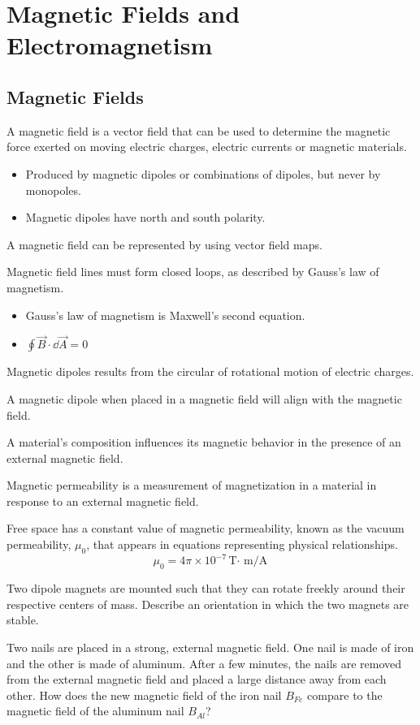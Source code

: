 \documentclass[../em.tex]{subfiles}
\begin{document}
\chapter{Magnetic Fields and Electromagnetism}
\section{Magnetic Fields}
A magnetic field is a vector field that can be used to determine the magnetic force exerted 
on moving electric charges, electric currents or magnetic materials.
\begin{itemize}
    \item Produced by magnetic dipoles or combinations of dipoles, but never by monopoles.
    \item Magnetic dipoles have north and south polarity.
\end{itemize}

A magnetic field can be represented by using vector field maps.

Magnetic field lines must form closed loops, as described by Gauss's law of magnetism.
\begin{itemize}
    \item Gauss's law of magnetism is Maxwell's second equation.
    \item $\oint \vec{B} \cdot \dd\vec{A} = 0$
\end{itemize}

Magnetic dipoles results from the circular of rotational motion of electric charges.

A magnetic dipole when placed in a magnetic field will align with the magnetic field.

A material's composition influences its magnetic behavior in the presence of an external magnetic field.

Magnetic permeability is a measurement of magnetization in a material in response to an external magnetic field.

Free space has a constant value of magnetic permeability, known as the vacuum permeability, $\mu_0$, that appears in equations representing physical relationships.
\[ \mu_0 = 4\pi \times 10^{-7} \text{T$\cdot$ m/A} \]

\ex Two dipole magnets are mounted such that they can rotate freekly around their respective centers of mass. Describe an orientation in which the two magnets are stable.

\ex Two nails are placed in a strong, external magnetic field. One nail is made of iron and the other is made of aluminum. After a few minutes, the nails are removed from the external 
magnetic field and placed a large distance away from each other. How does the new magnetic field of the iron nail $B_{Fe}$ compare to the magnetic field of the aluminum nail $B_{Al}$?
\end{document}
